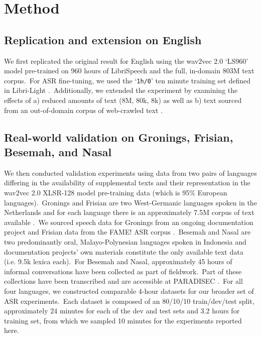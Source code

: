 \documentclass[main.tex]{subfiles}
\begin{document}
\section{Method}

\subsection{Replication and extension on English}

We first replicated the original result for English using the wav2vec 2.0 `LS960' model pre-trained on 960 hours of LibriSpeech and the full, in-domain 803M text corpus.~For ASR fine-tuning, we used the `\texttt{1h/0}' ten minute training set defined in Libri-Light \parencite{kahn2020libri}.~Additionally, we extended the experiment by examining the effects of a) reduced amounts of text (8M, 80k, 8k) as well as b) text sourced from an out-of-domain corpus of web-crawled text \parencite[Common Crawl-EN:][]{Buck-commoncrawl}.

\subsection{Real-world validation on Gronings, Frisian, Besemah, and Nasal}

We then conducted validation experiments using data from two pairs of languages differing in the availability of supplemental texts and their representation in the wav2vec 2.0 XLSR-128 model pre-training data (which is 95\% European languages).~Gronings and Frisian are two West-Germanic languages spoken in the Netherlands and for each language there is an approximately 7.5M corpus of text available \parencite{de-vries-etal-2021-adapting}.~We sourced speech data for Gronings from an ongoing documentation project and Frisian data from the FAME! ASR corpus \parencite{yilmaz2017longitudinal}.~Besemah and Nasal are two predominantly oral, Malayo-Polynesian languages spoken in Indonesia and documentation projects' own materials constitute the only available text data (i.e. 9.5k lexica each).~For Besemah and Nasal, approximately 45 hours of informal conversations have been collected as part of fieldwork.~Part of these collections have been transcribed and are accessible at \mbox{PARADISEC} \parencite{mcdonnell2008besemah,mcdonnell2019nasal}.~For all four languages, we constructed comparable 4-hour datasets for our broader set of ASR experiments.~Each dataset is composed of an 80/10/10 train/dev/test split, approximately 24 minutes for each of the dev and test sets and 3.2 hours for training set, from which we sampled 10 minutes for the experiments reported here.
\end{document}
